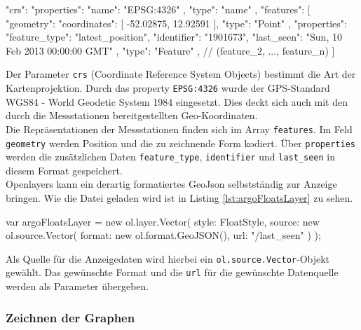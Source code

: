 \begin{javascript}[label={lst:argGeoJson}, caption={Gekürzte geoJSON zur Darstellung der Argo-Floats}]
 {
"crs": {
    "properties": {
      "name": "EPSG:4326"
    }, 
    "type": "name"
  }, 
  "features": [
    {
      "geometry": {
        "coordinates": [
          -52.02875, 
          12.92591
        ], 
        "type": "Point"
      }, 
      "properties": {
        "feature_type": "latest_position", 
        "identifier": "1901673", 
        "last_seen": "Sun, 10 Feb 2013 00:00:00 GMT"
      }, 
      "type": "Feature"
    },
    // (feature_2, ..., feature_n) 
    ]
}
\end{javascript}

Der Parameter \texttt{crs} (Coordinate Reference System Objects) bestimmt die Art der Kartenprojektion. Durch das property \texttt{EPSG:4326} wurde der GPS-Standard WGS84 - World Geodetic System 1984 eingesetzt. Dies deckt sich auch mit den durch die Messstationen bereitgestellten Geo-Koordinaten.
\\
Die Repräsentationen der Messstationen finden sich im Array \texttt{features}. Im Feld \texttt{geometry} werden Position und die zu zeichnende Form kodiert. Über \texttt{properties} werden die zusätzlichen Daten \texttt{feature\_type}, \texttt{identifier} und \texttt{last\_seen} in diesem Format gespeichert. 
\\
Openlayers kann ein derartig formatiertes GeoJson selbstständig zur Anzeige bringen. Wie die Datei geladen wird ist in Listing \ref{lst:argoFloatsLayer} zu sehen.

\begin{javascript}[label={lst:argoFloatsLayer}, caption={Die Funktion argoFloatsLayer}]
var argoFloatsLayer = new ol.layer.Vector({
    style: FloatStyle,
    source: new ol.source.Vector({
        format: new ol.format.GeoJSON(),
        url: "/last_seen"
    })
});
\end{javascript}
Als Quelle für die Anzeigedaten wird hierbei ein \texttt{ol.source.Vector}-Objekt gewählt. Das gewünschte Format und die \texttt{url} für die gewünschte Datenquelle werden als Parameter übergeben.









\subsubsection{Zeichnen der Graphen} \label{sec:ImplementierungPLOTS}









